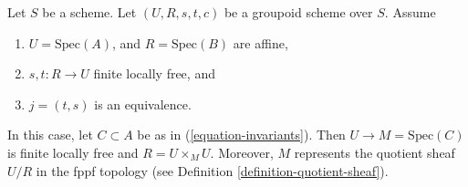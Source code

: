 \begin{proposition}
\label{proposition-finite-flat-equivalence}
Let $S$ be a scheme.
Let $(U, R, s, t, c)$ be a groupoid scheme over $S$.
Assume
\begin{enumerate}
\item $U = \text{Spec}(A)$, and $R = \text{Spec}(B)$ are affine,
\item $s, t : R \to U$ finite locally free, and
\item $j = (t, s)$ is an equivalence.
\end{enumerate}
In this case, let $C \subset A$ be as in
(\ref{equation-invariants}). Then $U \to M = \text{Spec}(C)$
is finite locally free and $R = U \times_M U$.
Moreover, $M$ represents the quotient sheaf $U/R$
in the fppf topology (see Definition \ref{definition-quotient-sheaf}).
\end{proposition}

